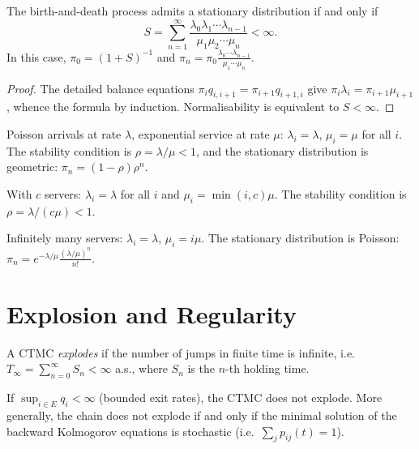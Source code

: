 \begin{theorem}
\label{thm:bd_stationary}
The birth-and-death process admits a stationary distribution if and only if
\[
  S = \sum_{n=1}^{\infty} \frac{\lambda_0 \lambda_1 \cdots \lambda_{n-1}}
  {\mu_1 \mu_2 \cdots \mu_n} < \infty.
\]
In this case, $\pi_0 = (1 + S)^{-1}$ and
$\pi_n = \pi_0 \frac{\lambda_0 \cdots \lambda_{n-1}}{\mu_1 \cdots \mu_n}$.
\end{theorem}

\begin{proof}
The detailed balance equations $\pi_i q_{i,i+1} = \pi_{i+1} q_{i+1,i}$
give $\pi_i \lambda_i = \pi_{i+1} \mu_{i+1}$, whence the formula by induction.
Normalisability is equivalent to $S < \infty$.
\end{proof}

\begin{example}[$M/M/1$ Queue]
Poisson arrivals at rate $\lambda$, exponential service at rate $\mu$:
$\lambda_i = \lambda$, $\mu_i = \mu$ for all $i$. The stability condition is
$\rho = \lambda/\mu < 1$, and the stationary distribution is geometric:
$\pi_n = (1 - \rho)\rho^n$.
\end{example}

\begin{example}[$M/M/c$ Queue]
With $c$ servers: $\lambda_i = \lambda$ for all $i$ and
$\mu_i = \min(i, c) \mu$. The stability condition is $\rho = \lambda/(c\mu) < 1$.
\end{example}

\begin{example}
Infinitely many servers: $\lambda_i = \lambda$, $\mu_i = i\mu$. The stationary
distribution is Poisson: $\pi_n = e^{-\lambda/\mu} \frac{(\lambda/\mu)^n}{n!}$.
\end{example}

\section{Explosion and Regularity}

\begin{definition}[Explosion]
A CTMC \emph{explodes} if the number of jumps in finite time is infinite, i.e.\
$T_{\infty} = \sum_{n=0}^{\infty} S_n < \infty$ a.s., where $S_n$ is the $n$-th
holding time.
\end{definition}

\begin{theorem}
\label{thm:non_explosion}
If $\sup_{i \in E} q_i < \infty$ (bounded exit rates), the CTMC does not explode.
More generally, the chain does not explode if and only if the minimal solution
of the backward Kolmogorov equations is stochastic (i.e.\ $\sum_j p_{ij}(t) = 1$).
\end{theorem}

